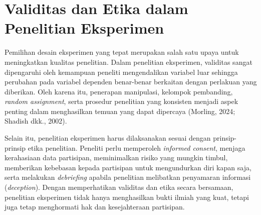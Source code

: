 \documentclass[
  indonesian,
  letterpaper,
  DIV=11,
  numbers=noendperiod]{scrreprt}
\begin{document}
\section{Validitas dan Etika dalam Penelitian
Eksperimen}\label{validitas-dan-etika-dalam-penelitian-eksperimen}

Pemilihan desain eksperimen yang tepat merupakan salah satu upaya untuk
meningkatkan kualitas penelitian. Dalam penelitian eksperimen, validitas
sangat dipengaruhi oleh kemampuan peneliti mengendalikan variabel luar
sehingga perubahan pada variabel dependen benar-benar berkaitan dengan
perlakuan yang diberikan. Oleh karena itu, penerapan manipulasi,
kelompok pembanding, \emph{random assignment}, serta prosedur penelitian
yang konsisten menjadi aspek penting dalam menghasilkan temuan yang
dapat dipercaya (Morling, 2024; Shadish dkk., 2002).

Selain itu, penelitian eksperimen harus dilaksanakan sesuai dengan
prinsip-prinsip etika penelitian. Peneliti perlu memperoleh
\emph{informed consent}, menjaga kerahasiaan data partisipan,
meminimalkan risiko yang mungkin timbul, memberikan kebebasan kepada
partisipan untuk mengundurkan diri kapan saja, serta melakukan
\emph{debriefing} apabila penelitian melibatkan penyamaran informasi
(\emph{deception}). Dengan memperhatikan validitas dan etika secara
bersamaan, penelitian eksperimen tidak hanya menghasilkan bukti ilmiah
yang kuat, tetapi juga tetap menghormati hak dan kesejahteraan
partisipan.
\end{document}
